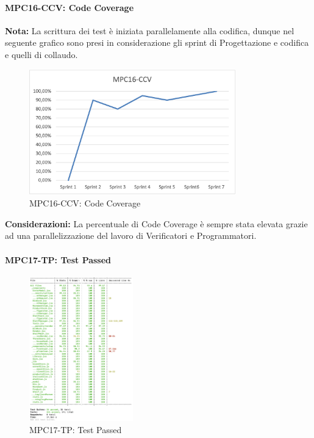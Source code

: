 \newpage

\paragraph{MPC16-CCV: Code Coverage}
\textbf{Nota:} La scrittura dei test è iniziata parallelamente alla codifica, dunque nel seguente grafico sono presi in considerazione gli sprint di Progettazione e codifica e quelli di collaudo.
\begin{figure}[h!] 
    \centering
    \includegraphics[width=0.8\textwidth]{images/MPC16-CCV.png}
    \caption{MPC16-CCV: Code Coverage}
\end{figure}

\noindent \textbf{Considerazioni:} La percentuale di Code Coverage è sempre stata elevata grazie ad una parallelizzazione del lavoro di Verificatori e Programmatori.

\paragraph{MPC17-TP: Test Passed}
\begin{figure}[h!] 
    \centering
    \includegraphics[width=0.4\textwidth]{images/MPC17-TP.png}
    \caption{MPC17-TP: Test Passed}
\end{figure}

